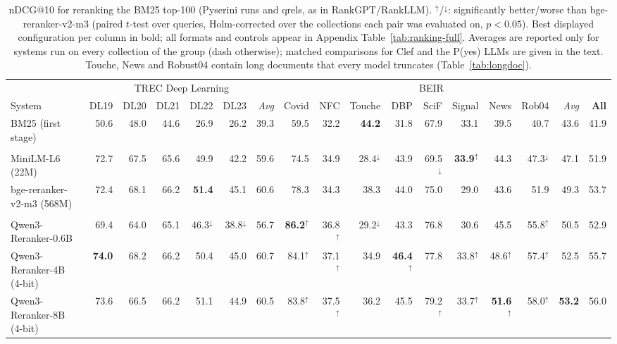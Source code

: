 \begin{table}[t]
\centering
\footnotesize
\setlength{\tabcolsep}{2.6pt}
\caption{nDCG@10 for reranking the BM25 top-100 (Pyserini runs and qrels, as in RankGPT/RankLLM). $^\uparrow$/$^\downarrow$: significantly better/worse than bge-reranker-v2-m3 (paired $t$-test over queries, Holm-corrected over the collections each pair was evaluated on, $p<0.05$). Best displayed configuration per column in bold; all formats and controls appear in Appendix Table~\ref{tab:ranking-full}. Averages are reported only for systems run on every collection of the group (dash otherwise); matched comparisons for Clef and the P(yes) LLMs are given in the text. Touche, News and Robust04 contain long documents that every model truncates (Table~\ref{tab:longdoc}).}
\label{tab:ranking}
\begin{tabular}{lrrrrr|r|rrrrrrrr|r|r}
\toprule
 & \multicolumn{6}{c|}{TREC Deep Learning} & \multicolumn{9}{c|}{BEIR} & \\
System & DL19 & DL20 & DL21 & DL22 & DL23 & \textit{Avg} & Covid & NFC & Touche & DBP & SciF & Signal & News & Rob04 & \textit{Avg} & \textbf{All} \\
\midrule
BM25 (first stage) & 50.6 & 48.0 & 44.6 & 26.9 & 26.2 & 39.3 & 59.5 & 32.2 & \textbf{44.2} & 31.8 & 67.9 & 33.1 & 39.5 & 40.7 & 43.6 & 41.9 \\
\addlinespace[1pt]
\multicolumn{17}{l}{\textit{Cross-encoders}} \\
MiniLM-L6 (22M) & 72.7 & 67.5 & 65.6 & 49.9 & 42.2 & 59.6 & 74.5 & 34.9 & 28.4$^\downarrow$ & 43.9 & 69.5$^\downarrow$ & \textbf{33.9}$^\uparrow$ & 44.3 & 47.3$^\downarrow$ & 47.1 & 51.9 \\
bge-reranker-v2-m3 (568M) & 72.4 & 68.1 & 66.2 & \textbf{51.4} & 45.1 & 60.6 & 78.3 & 34.3 & 38.3 & 44.0 & 75.0 & 29.0 & 43.6 & 51.9 & 49.3 & 53.7 \\
\addlinespace[1pt]
\multicolumn{17}{l}{\textit{Label-probability LLM rerankers}} \\
Qwen3-Reranker-0.6B & 69.4 & 64.0 & 65.1 & 46.3$^\downarrow$ & 38.8$^\downarrow$ & 56.7 & \textbf{86.2}$^\uparrow$ & 36.8$^\uparrow$ & 29.2$^\downarrow$ & 43.3 & 76.8 & 30.6 & 45.5 & 55.8$^\uparrow$ & 50.5 & 52.9 \\
Qwen3-Reranker-4B (4-bit) & \textbf{74.0} & 68.2 & 66.2 & 50.4 & 45.0 & 60.7 & 84.1$^\uparrow$ & 37.1$^\uparrow$ & 34.9 & \textbf{46.4}$^\uparrow$ & 77.8 & 33.8$^\uparrow$ & 48.6$^\uparrow$ & 57.4$^\uparrow$ & 52.5 & 55.7 \\
Qwen3-Reranker-8B (4-bit) & 73.6 & 66.5 & 66.2 & 51.1 & 44.9 & 60.5 & 83.8$^\uparrow$ & 37.5$^\uparrow$ & 36.2 & 45.5 & 79.2$^\uparrow$ & 33.7$^\uparrow$ & \textbf{51.6}$^\uparrow$ & 58.0$^\uparrow$ & \textbf{53.2} & 56.0 \\

\end{tabular}
\end{table}
